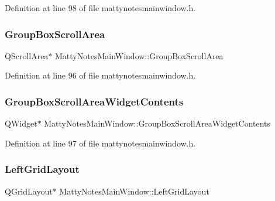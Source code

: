 Definition at line 98 of file mattynotesmainwindow.\+h.

\hypertarget{classMattyNotesMainWindow_a86b43b5faf9df668013aa95be9be54f5}{}\label{classMattyNotesMainWindow_a86b43b5faf9df668013aa95be9be54f5} 
\subsubsection{\texorpdfstring{Group\+Box\+Scroll\+Area}{GroupBoxScrollArea}}
{\footnotesize\ttfamily Q\+Scroll\+Area$\ast$ Matty\+Notes\+Main\+Window\+::\+Group\+Box\+Scroll\+Area\hspace{0.3cm}{\ttfamily [private]}}



Definition at line 96 of file mattynotesmainwindow.\+h.

\hypertarget{classMattyNotesMainWindow_aa494ff6b293445e08b9a706938536450}{}\label{classMattyNotesMainWindow_aa494ff6b293445e08b9a706938536450} 
\subsubsection{\texorpdfstring{Group\+Box\+Scroll\+Area\+Widget\+Contents}{GroupBoxScrollAreaWidgetContents}}
{\footnotesize\ttfamily Q\+Widget$\ast$ Matty\+Notes\+Main\+Window\+::\+Group\+Box\+Scroll\+Area\+Widget\+Contents\hspace{0.3cm}{\ttfamily [private]}}



Definition at line 97 of file mattynotesmainwindow.\+h.

\hypertarget{classMattyNotesMainWindow_aaba04f791304a6ccca1c96bef35b52d6}{}\label{classMattyNotesMainWindow_aaba04f791304a6ccca1c96bef35b52d6} 
\subsubsection{\texorpdfstring{Left\+Grid\+Layout}{LeftGridLayout}}
{\footnotesize\ttfamily Q\+Grid\+Layout$\ast$ Matty\+Notes\+Main\+Window\+::\+Left\+Grid\+Layout\hspace{0.3cm}{\ttfamily [private]}}



